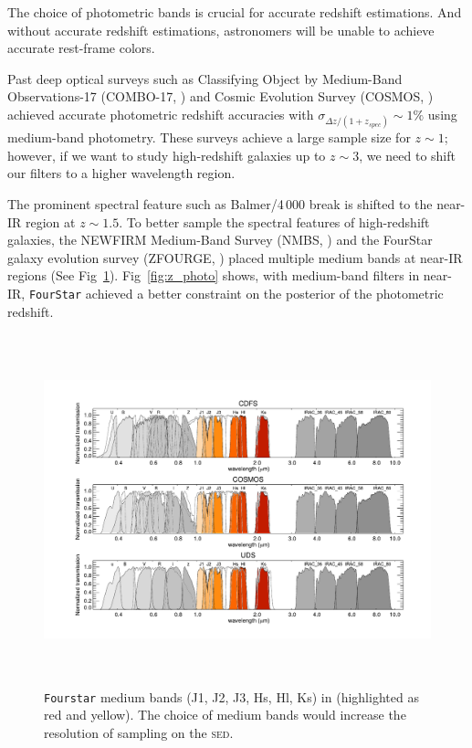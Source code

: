 \documentclass{ar-1col}
\begin{document}
The choice of photometric bands is crucial for accurate redshift estimations. 
And without accurate redshift estimations, astronomers will be unable to achieve accurate rest-frame colors.

Past deep optical surveys such as Classifying Object by Medium-Band Observations-17 (COMBO-17, \citet{Wolf2003}) and Cosmic Evolution Survey (COSMOS, \citet{Scoville2007}) achieved accurate photometric redshift accuracies with $ \sigma_{\Delta z / (1 + z_{spec})} \sim 1\% $ using medium-band photometry.
These surveys achieve a large sample size for $ z \sim 1 $; however, if we want to study high-redshift galaxies up to $ z \sim 3 $, we need to shift our filters to a higher wavelength region. 

The prominent spectral feature such as Balmer/4\,000 break is shifted to the near-IR region at $ z \sim 1.5 $.
To better sample the spectral features of high-redshift galaxies, the NEWFIRM Medium-Band Survey (NMBS, \citet{Whitaker2011}) and the FourStar galaxy evolution survey (ZFOURGE, \citet{Straatman2016}) placed multiple medium bands at near-IR regions (See Fig~\ref{fig:medium_bands}).
Fig~\ref{fig:z_photo} shows, with medium-band filters in near-IR, \texttt{FourStar} achieved a better constraint on the posterior of the photometric redshift. 


\begin{figure}
    \includegraphics[width=6in, height=4in]{images/medium_bands.pdf}
    \caption{\texttt{Fourstar} medium bands (J1, J2, J3, Hs, Hl, Ks) in \citet{Straatman2016} (highlighted as red and yellow). The choice of medium bands would increase the resolution of sampling on the \textsc{sed}.}
    \label{fig:medium_bands}
\end{figure}
\end{document}
